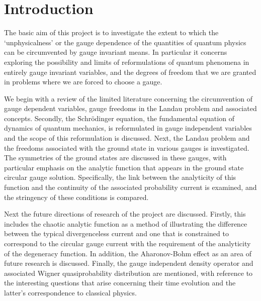 \section{Introduction}
\label{sec:introduction}

The basic aim of this project is to investigate the extent to which the
`unphysicalness' or the gauge dependence of the quantities of quantum physics
can be circumvented by gauge invariant means. In particular it concerns
exploring the possibility and limits of reformulations of quantum phenomena in
entirely gauge invariant variables, and the degrees of freedom that we are
granted in problems where we are forced to choose a gauge.

We begin with a review of the limited literature concerning the circumvention of
gauge dependent variables, gauge freedoms in the Landau problem and associated
concepts. Secondly, the Schr\"odinger equation, the fundamental equation of
dynamics of quantum mechanics, is reformulated in gauge independent variables
and the scope of this reformulation is discussed. Next, the Landau problem and
the freedoms associated with the ground state in various gauges is investigated.
The symmetries of the ground states are discussed in these gauges, with
particular emphasis on the analytic function that appears in the ground state
circular gauge solution. Specifically, the link between the analyticity of this
function and the continuity of the associated probability current is examined,
and the stringency of these conditions is compared.

Next the future directions of research of the project are discussed. Firstly,
this includes the chaotic analytic function as a method of illustrating the
difference between the typical divergenceless current and one that is
constrained to correspond to the circular gauge current with the requirement of
the analyticity of the degeneracy function. In addition, the Aharonov-Bohm
effect as an area of future research is discussed. Finally, the gauge
independent density operator and associated Wigner quasiprobability distribution
are mentioned, with reference to the interesting questions that arise concerning
their time evolution and the latter's correspondence to classical physics.
